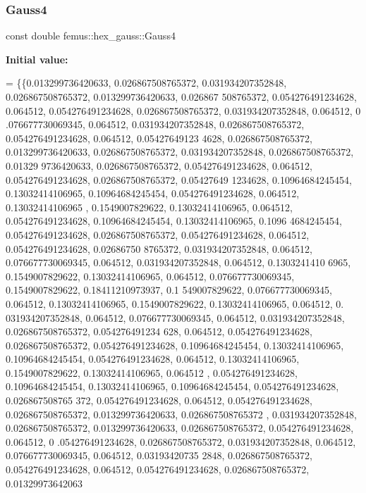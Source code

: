 \subsubsection{\texorpdfstring{Gauss4}{Gauss4}}
{\footnotesize\ttfamily const double femus\+::hex\+\_\+gauss\+::\+Gauss4\hspace{0.3cm}{\ttfamily [static]}}

{\bfseries Initial value\+:}
\begin{DoxyCode}
= \{\{0.013299736420633, 0.026867508765372, 0.031934207352848, 0.026867508765372, 0.013299736420633, 0.026867
      508765372, 0.054276491234628, 0.064512, 0.054276491234628, 0.026867508765372, 0.031934207352848, 0.064512, 0
      .076677730069345, 0.064512, 0.031934207352848, 0.026867508765372, 0.054276491234628, 0.064512, 0.05427649123
      4628, 0.026867508765372, 0.013299736420633, 0.026867508765372, 0.031934207352848, 0.026867508765372, 0.01329
      9736420633, 0.026867508765372, 0.054276491234628, 0.064512, 0.054276491234628, 0.026867508765372, 0.05427649
      1234628, 0.10964684245454, 0.13032414106965, 0.10964684245454, 0.054276491234628, 0.064512, 0.13032414106965
      , 0.1549007829622, 0.13032414106965, 0.064512, 0.054276491234628, 0.10964684245454, 0.13032414106965, 0.1096
      4684245454, 0.054276491234628, 0.026867508765372, 0.054276491234628, 0.064512, 0.054276491234628, 0.02686750
      8765372, 0.031934207352848, 0.064512, 0.076677730069345, 0.064512, 0.031934207352848, 0.064512, 0.1303241410
      6965, 0.1549007829622, 0.13032414106965, 0.064512, 0.076677730069345, 0.1549007829622, 0.18411210973937, 0.1
      549007829622, 0.076677730069345, 0.064512, 0.13032414106965, 0.1549007829622, 0.13032414106965, 0.064512, 0.
      031934207352848, 0.064512, 0.076677730069345, 0.064512, 0.031934207352848, 0.026867508765372, 0.054276491234
      628, 0.064512, 0.054276491234628, 0.026867508765372, 0.054276491234628, 0.10964684245454, 0.13032414106965, 
      0.10964684245454, 0.054276491234628, 0.064512, 0.13032414106965, 0.1549007829622, 0.13032414106965, 0.064512
      , 0.054276491234628, 0.10964684245454, 0.13032414106965, 0.10964684245454, 0.054276491234628, 0.026867508765
      372, 0.054276491234628, 0.064512, 0.054276491234628, 0.026867508765372, 0.013299736420633, 0.026867508765372
      , 0.031934207352848, 0.026867508765372, 0.013299736420633, 0.026867508765372, 0.054276491234628, 0.064512, 0
      .054276491234628, 0.026867508765372, 0.031934207352848, 0.064512, 0.076677730069345, 0.064512, 0.03193420735
      2848, 0.026867508765372, 0.054276491234628, 0.064512, 0.054276491234628, 0.026867508765372, 0.01329973642063

\end{DoxyCode}
